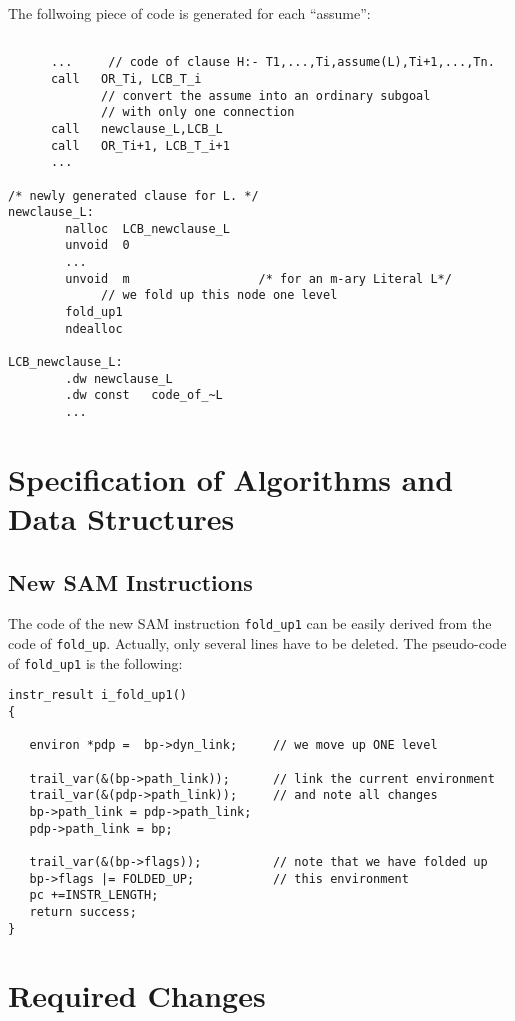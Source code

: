 The follwoing piece of code is generated for each ``assume'':

\begin{verbatim}

      ...     // code of clause H:- T1,...,Ti,assume(L),Ti+1,...,Tn.
      call   OR_Ti, LCB_T_i
             // convert the assume into an ordinary subgoal
             // with only one connection
      call   newclause_L,LCB_L
      call   OR_Ti+1, LCB_T_i+1
      ...

/* newly generated clause for L. */
newclause_L:
        nalloc	LCB_newclause_L
        unvoid  0
        ...
        unvoid  m                  /* for an m-ary Literal L*/
             // we fold up this node one level
        fold_up1                 
        ndealloc

LCB_newclause_L:
        .dw	newclause_L
        .dw	const	code_of_~L
        ...
\end{verbatim}

\newpage
\section{Specification of Algorithms and Data Structures}

\subsection{New SAM Instructions}

The code of the new SAM instruction {\tt fold\_up1} can be easily
derived from the code of {\tt fold\_up}. Actually, only several
lines have to be deleted.
The pseudo-code of {\tt fold\_up1} is the following:

\begin{verbatim}
instr_result i_fold_up1()
{

   environ *pdp =  bp->dyn_link;     // we move up ONE level

   trail_var(&(bp->path_link));      // link the current environment
   trail_var(&(pdp->path_link));     // and note all changes
   bp->path_link = pdp->path_link;
   pdp->path_link = bp;

   trail_var(&(bp->flags));          // note that we have folded up
   bp->flags |= FOLDED_UP;           // this environment
   pc +=INSTR_LENGTH;
   return success;
}
\end{verbatim}

\section{Required Changes}

